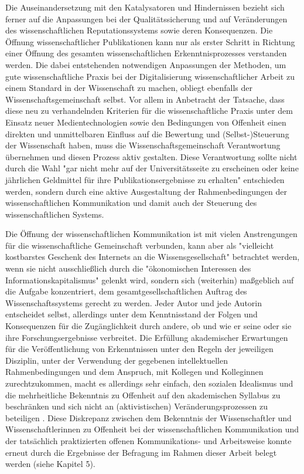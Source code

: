 Die Auseinandersetzung mit den Katalysatoren und Hindernissen bezieht sich ferner auf die Anpassungen bei der Qualitätssicherung und auf Veränderungen des wissenschaftlichen Reputationssystems sowie deren Konsequenzen. Die Öffnung wissenschaftlicher Publikationen kann nur als erster Schritt in Richtung einer Öffnung des gesamten wissenschaftlichen Erkenntnisprozesses verstanden werden. Die dabei entstehenden notwendigen Anpassungen der Methoden, um gute wissenschaftliche Praxis bei der Digitalisierung wissenschaftlicher Arbeit zu einem Standard in der Wissenschaft zu machen, obliegt ebenfalls der Wissenschaftsgemeinschaft selbst. Vor allem in Anbetracht der Tatsache, dass diese neu zu verhandelnden Kriterien für die wissenschaftliche Praxis unter dem Einsatz neuer Medientechnologien sowie den Bedingungen von Offenheit einen direkten und unmittelbaren Einfluss auf die Bewertung und (Selbst-)Steuerung der Wissenschaft haben, muss die Wissenschaftsgemeinschaft Verantwortung übernehmen und diesen Prozess aktiv gestalten. Diese Verantwortung sollte nicht durch die Wahl "gar nicht mehr auf der Universitätsseite zu erscheinen oder keine jährlichen Geldmittel für ihre Publikationsergebnisse zu erhalten" \cite{Warnke_2012} entschieden werden, sondern durch eine aktive Ausgestaltung der Rahmenbedingungen der wissenschaftlichen Kommunikation und damit auch der Steuerung des wissenschaftlichen Systems.

Die Öffnung der wissenschaftlichen Kommunikation ist mit vielen Anstrengungen für die wissenschaftliche Gemeinschaft verbunden, kann aber als "vielleicht kostbarstes Geschenk des Internets an die Wissensgesellschaft" betrachtet werden, wenn sie nicht ausschließlich durch die "ökonomischen Interessen des Informationskapitalismus" \cite[:65]{Hagner_2015} gelenkt wird, sondern sich (weiterhin) maßgeblich auf die Aufgabe konzentriert, dem gesamtgesellschaftlichen Auftrag des Wissenschaftssystems gerecht zu werden. Jeder Autor und jede Autorin entscheidet selbst, allerdings unter dem Kenntnisstand der Folgen und Konsequenzen für die Zugänglichkeit durch andere, ob und wie er seine oder sie ihre Forschungsergebnisse verbreitet. Die Erfüllung akademischer Erwartungen für die Veröffentlichung von Erkenntnissen unter den Regeln der jeweiligen Disziplin, unter der Verwendung der gegebenen intellektuellen Rahmenbedingungen und dem Anspruch, mit Kollegen und Kolleginnen zurechtzukommen, macht es allerdings sehr einfach, den sozialen Idealismus und die mehrheitliche Bekenntnis zu Offenheit \cite[:66]{Hagner_2015} auf den akademischen Syllabus zu beschränken und sich nicht an (aktivistischen) Veränderungsprozessen zu beteiligen \cite[:25]{Flood_2013}. Diese Diskrepanz zwischen dem Bekenntnis der Wissenschaftler und Wissenschaftlerinnen zu Offenheit bei der wissenschaftlichen Kommunikation und der tatsächlich praktizierten offenen Kommunikations- und Arbeitsweise konnte erneut durch die Ergebnisse der Befragung im Rahmen dieser Arbeit belegt werden (siehe Kapitel 5).

